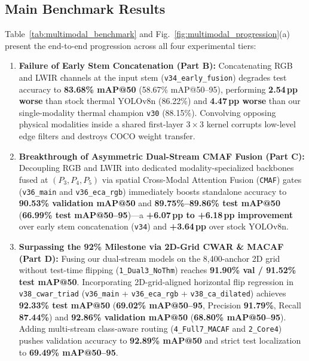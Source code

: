 \documentclass[journal,twoside,web]{ieeecolor}
\begin{document}
\subsection{Main Benchmark Results}
Table~\ref{tab:multimodal_benchmark} and Fig.~\ref{fig:multimodal_progression}(a) present the end-to-end progression across all four experimental tiers:
\begin{enumerate}
    \item \textbf{Failure of Early Stem Concatenation (Part B):} Concatenating RGB and LWIR channels at the input stem (\texttt{v34\_early\_fusion}) degrades test accuracy to \textbf{83.68\% mAP@50} (58.67\% mAP@50--95), performing \textbf{2.54\,pp worse} than stock thermal YOLOv8n (86.22\%) and \textbf{4.47\,pp worse} than our single-modality thermal champion \texttt{v30} (88.15\%). Convolving opposing physical modalities inside a shared first-layer $3\times 3$ kernel corrupts low-level edge filters and destroys COCO weight transfer.
    \item \textbf{Breakthrough of Asymmetric Dual-Stream CMAF Fusion (Part C):} Decoupling RGB and LWIR into dedicated modality-specialized backbones fused at $(P_3, P_4, P_5)$ via spatial Cross-Modal Attention Fusion (\texttt{CMAF}) gates (\texttt{v36\_main} and \texttt{v36\_eca\_rgb}) immediately boosts standalone accuracy to \textbf{90.53\% validation mAP@50} and \textbf{89.75\%--89.86\% test mAP@50} (\textbf{66.99\% test mAP@50--95})---a \textbf{+6.07\,pp to +6.18\,pp improvement} over early stem concatenation (\texttt{v34}) and \textbf{+3.64\,pp} over stock YOLOv8n.
    \item \textbf{Surpassing the 92\% Milestone via 2D-Grid CWAR \& MACAF (Part D):} Fusing our dual-stream models on the 8,400-anchor 2D grid without test-time flipping (\texttt{1\_Dual3\_NoThm}) reaches \textbf{91.90\% val / 91.52\% test mAP@50}. Incorporating 2D-grid-aligned horizontal flip regression in \texttt{v38\_cwar\_triad} (\texttt{v36\_main} + \texttt{v36\_eca\_rgb} + \texttt{v38\_ca\_dilated}) achieves \textbf{92.33\% test mAP@50} (\textbf{69.02\% mAP@50--95}, Precision \textbf{91.79\%}, Recall \textbf{87.44\%}) and \textbf{92.86\% validation mAP@50} (\textbf{68.80\% mAP@50--95}). Adding multi-stream class-aware routing (\texttt{4\_Full7\_MACAF} and \texttt{2\_Core4}) pushes validation accuracy to \textbf{92.89\% mAP@50} and strict test localization to \textbf{69.49\% mAP@50--95}.
\end{enumerate}
\end{document}
